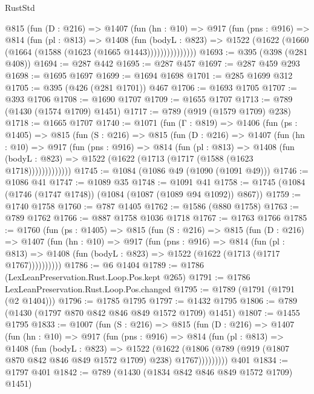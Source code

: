 \begin{lexlean}{RustStd}
\begin{coremodule}
          @815
            (fun (D : @216) =>
            @1407
              (fun (hn : @10) =>
              @917
                (fun (pns : @916) =>
                @814
                  (fun (pl : @813) =>
                  @1408
                    (fun (bodyL : @823) =>
                    @1522 (@1622 (@1660 (@1664 (@1588 (@1623 (@1665 @1443)))))))))))))))
@1693 := @395 (@398 (@281 @408))
@1694 := @287 @442
@1695 := @287 @457
@1697 := @287 @459 @293
@1698 := @1695 @1697
@1699 := @1694 @1698
@1701 := @285 @1699 @312
@1705 := @395 (@426 (@281 @1701)) @467
@1706 := @1693 @1705
@1707 := @393 @1706
@1708 := @1690 @1707
@1709 := @1655 @1707
@1713 := @789 (@1430 (@1574 @1709) @1451)
@1717 := @789 (@919 (@1579 @1709) @238)
@1718 := @1665 @1707
@1740 := @1071
    (fun (Γ : @819) =>
    @1406
      (fun (ps : @1405) =>
      @815
        (fun (S : @216) =>
        @815
          (fun (D : @216) =>
          @1407
            (fun (hn : @10) =>
            @917
              (fun (pns : @916) =>
              @814
                (fun (pl : @813) =>
                @1408
                  (fun (bodyL : @823) => @1522 (@1622 (@1713 (@1717 (@1588 (@1623 @1718)))))))))))))
@1745 := @1084 (@1086 @49 (@1090 (@1091 @49)))
@1746 := @1086 @41
@1747 := @1089 @35
@1748 := @1091 @41
@1758 := @1745 (@1084 (@1746 (@1747 @1748)) (@1084 (@1087 (@1089 @94 @1092)) @867))
@1759 := @1740 @1758
@1760 := @787 @1405
@1762 := @1586 (@880 @1758)
@1763 := @789 @1762
@1766 := @887 @1758 @1036 @1718
@1767 := @1763 @1766
@1785 := @1760
    (fun (ps : @1405) =>
    @815
      (fun (S : @216) =>
      @815
        (fun (D : @216) =>
        @1407
          (fun (hn : @10) =>
          @917
            (fun (pns : @916) =>
            @814
              (fun (pl : @813) =>
              @1408 (fun (bodyL : @823) => @1522 (@1622 (@1713 (@1717 @1767))))))))))
@1786 := @6 @1404
@1789 := @1786 (LexLeanPreservation.Rust.Loop.Pos.kept @265)
@1791 := @1786 LexLeanPreservation.Rust.Loop.Pos.changed
@1795 := @1789 (@1791 (@1791 (@2 @1404)))
@1796 := @1785 @1795
@1797 := @1432 @1795
@1806 := @789 (@1430 (@1797 @870 @842 @846 @849 @1572 @1709) @1451)
@1807 := @1455 @1795
@1833 := @1007
    (fun (S : @216) =>
    @815
      (fun (D : @216) =>
      @1407
        (fun (hn : @10) =>
        @917
          (fun (pns : @916) =>
          @814
            (fun (pl : @813) =>
            @1408
              (fun (bodyL : @823) =>
              @1522
                (@1622
                  (@1806 (@789 (@919 (@1807 @870 @842 @846 @849 @1572 @1709) @238) @1767)))))))))
    @401
@1834 := @1797 @401
@1842 := @789 (@1430 (@1834 @842 @846 @849 @1572 @1709) @1451)

\end{coremodule}
\end{lexlean}
